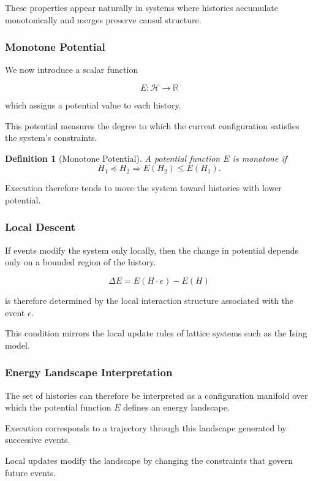 \documentclass[12pt]{article}
\newtheorem{definition}{Definition}
\begin{document}
These properties appear naturally in systems where
histories accumulate monotonically and merges
preserve causal structure.

\subsubsection{Monotone Potential}

We now introduce a scalar function

\[
E : \mathcal{H} \rightarrow \mathbb{R}
\]

which assigns a potential value to each history.

This potential measures the degree to which
the current configuration satisfies the system's
constraints.

\begin{definition}[Monotone Potential]
A potential function $E$ is monotone if
\[
H_1 \preceq H_2 \Rightarrow E(H_2) \leq E(H_1).
\]
\end{definition}

Execution therefore tends to move the system toward
histories with lower potential.

\subsubsection{Local Descent}

If events modify the system only locally,
then the change in potential depends only
on a bounded region of the history.

\[
\Delta E = E(H \cdot e) - E(H)
\]

is therefore determined by the local interaction
structure associated with the event $e$.

This condition mirrors the local update rules
of lattice systems such as the Ising model.

\subsubsection{Energy Landscape Interpretation}

The set of histories can therefore be interpreted
as a configuration manifold over which the potential
function $E$ defines an energy landscape.

Execution corresponds to a trajectory through this
landscape generated by successive events.

Local updates modify the landscape by changing
the constraints that govern future events.
\end{document}
